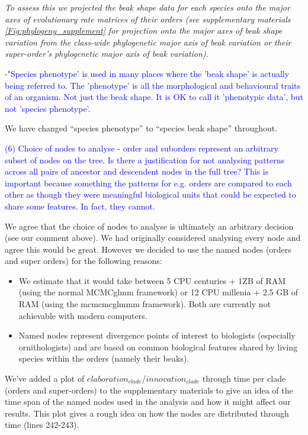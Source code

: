 \documentclass[12pt,letterpaper]{article}
\begin{document}
{\noindent\textit{To assess this we projected the beak shape data for each species onto %
the major axes of evolutionary rate matrices of their orders (see supplementary materials \ref{Fig:phylogeny_supplement} for projection onto the major axes of beak shape variation from the class-wide phylogenetic major axis of beak variation or their super-order’s phylogenetic major axis of beak variation).}

\textcolor{blue}{-"Species phenotype' is used in many places where the 'beak shape' is actually being referred to. The 'phenotype' is all the morphological and behavioural traits of an organism. Not just the beak shape. It is OK to call it 'phenotypic data', but not 'species phenotype'.}

We have changed “species phenotype” to “species beak shape” throughout.

\textcolor{blue}{(6) Choice of nodes to analyse - order and suborders represent an arbitrary subset of nodes on the tree. Is there a justification for not analysing patterns across all pairs of ancestor and descendent nodes in the full tree? This is important because something the patterns for e.g. orders are compared to each other as though they were meaningful biological units that could be expected to share some features. In fact, they cannot.}

We agree that the choice of nodes to analyse is ultimately an arbitrary decision (see our comment above). We had originally considered analysing every node and agree this would be great. However we decided to use the named nodes (orders and super orders) for the following reasons:
\begin{itemize}
\item We estimate that it would take between 5 CPU centuries + 1ZB of RAM (using the normal MCMCglmm framework) or 12 CPU millenia + 2.5 GB of RAM (using the mcmcmcglmmm framework). Both are currently not achievable with modern computers.
\item Named nodes represent divergence points of interest to biologists (especially ornithologists) and are based on common biological features shared by living species within the orders (namely their beaks).
\end{itemize}

We’ve added a plot of $elaboration_{clade}$/$innovation_{clade}$ through time per clade (orders and super-orders) to the supplementary materials to give an idea of the time span of the named nodes used in the analysis and how it might affect our results. This plot gives a rough idea on how the nodes are distributed through time (lines 242-243).

}
\end{document}
